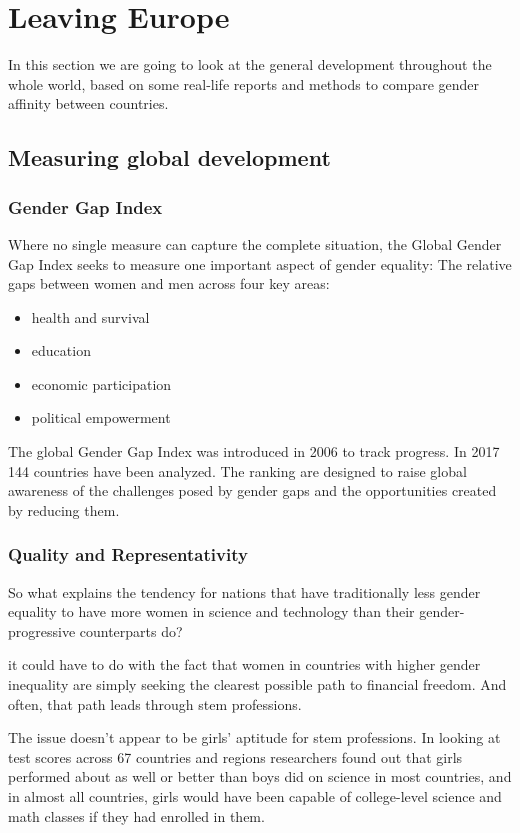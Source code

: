 	\section{Leaving Europe}
	In this section we are going to look at the general development throughout the whole world, based on some real-life reports and methods to compare gender affinity between countries.
	
	\subsection{Measuring global development}
	
	\subsubsection{Gender Gap Index}
	
	Where no single measure can capture the complete situation, the Global Gender Gap Index seeks to measure one important aspect of gender equality: The relative gaps between women and men across four key areas:
	\begin{itemize}
		\item health and survival
		\item education
		\item economic participation
		\item political empowerment
	\end{itemize}
	The global Gender Gap Index was introduced in 2006 to track progress. In 2017 144 countries have been analyzed. 
	The ranking are designed to raise global awareness of the challenges posed by gender gaps and the opportunities created by reducing them. \cite{t_gender}
	
	\subsubsection{Quality and Representativity}
	
	So what explains the tendency for nations that have traditionally less gender equality to have more women in science and technology than their gender-progressive counterparts do?
	
	it could have to do with the fact that women in countries with higher gender inequality are simply seeking the clearest possible path to financial freedom. And often, that path leads through stem professions.
	
	The issue doesn’t appear to be girls’ aptitude for stem professions. In looking at test scores across 67 countries and regions researchers found out that girls performed about as well or better than boys did on science in most countries, and in almost all countries, girls would have been capable of college-level science and math classes if they had enrolled in them.
	
